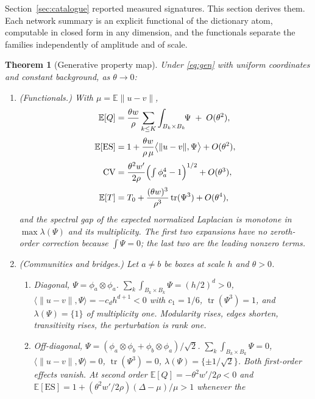 \documentclass[11pt]{article}
\newtheorem{theorem}{Theorem}[section]
\theoremstyle{definition}
\newcommand{\1}{\mathbf 1}\newcommand{\op}{\operatorname}
\begin{document}
Section~\ref{sec:catalogue} reported measured signatures.  This section derives
them.  Each network summary is an explicit functional of the dictionary
atom, computable in closed form in any dimension, and the functionals
separate the families independently of amplitude and of scale.

\begin{theorem}[Generative property map]\label{thm:map}
Under \eqref{eq:gen} with uniform coordinates and constant background, as
$\theta\to0$:
\begin{enumerate}[label=\textup{(\roman*)},leftmargin=*,itemsep=2pt]
\item \textup{(Functionals.)} With $\mu=\mathbb E\|u-v\|$,
\begin{align}
\mathbb E[Q]&=\frac{\theta w}{\rho}\sum_{k\le K}\int_{B_k\times B_k}\!\!\Psi\;+\;O(\theta^{2}),
\label{eq:mapQ}\\[2pt]
\mathbb E[\mathrm{ES}]&=1+\frac{\theta w}{\rho\,\mu}\bigl\langle\|u-v\|,\Psi\bigr\rangle+O(\theta^{2}),
\label{eq:mapES}\\[2pt]
\mathrm{CV}&=\frac{\theta^{2}w'}{2\rho}\Bigl(\textstyle\int\phi_a^{4}-1\Bigr)^{1/2}+O(\theta^{3}),
\label{eq:mapCV}\\[2pt]
\mathbb E[T]&=T_0+\frac{(\theta w)^{3}}{\rho^{3}}\operatorname{tr}(\Psi^{3})+O(\theta^{4}),
\label{eq:mapT}
\end{align}
and the spectral gap of the expected normalized Laplacian is monotone in
$\max\lambda(\Psi)$ and its multiplicity.  The first two expansions have no
zeroth-order correction because $\int\Psi=0$; the last two are the leading
nonzero terms.
\item \textup{(Communities and bridges.)} Let $a\ne b$ be boxes at scale $h$ and $\theta>0$.
\begin{enumerate}[label=\textup{(\alph*)},leftmargin=*]
\item \emph{Diagonal, $\Psi=\phi_a\otimes\phi_a$.}
$\sum_k\int_{B_k\times B_k}\Psi=(h/2)^{d}>0$,
$\langle\|u-v\|,\Psi\rangle=-c_dh^{d+1}<0$ with $c_1=1/6$,
$\operatorname{tr}(\Psi^{3})=1$, and $\lambda(\Psi)=\{1\}$ of multiplicity one.
Modularity rises, edges shorten, transitivity rises, the perturbation is rank
one.
\item \emph{Off-diagonal, $\Psi=(\phi_a\otimes\phi_b+\phi_b\otimes\phi_a)/\sqrt2$.}
$\sum_k\int_{B_k\times B_k}\Psi=0$, $\langle\|u-v\|,\Psi\rangle=0$,
$\operatorname{tr}(\Psi^{3})=0$, $\lambda(\Psi)=\{\pm1/\sqrt2\}$.  Both
first-order effects vanish.  At second order
$\mathbb E[Q]=-\theta^{2}w'/2\rho<0$ and
$\mathbb E[\mathrm{ES}]=1+(\theta^{2}w'/2\rho)(\Delta-\mu)/\mu>1$ whenever the

\end{enumerate}
\end{enumerate}
\end{theorem}
\end{document}
